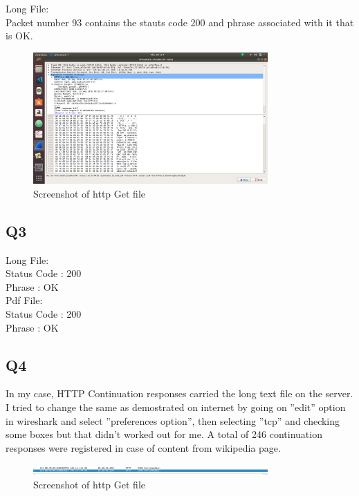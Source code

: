 \documentclass{article}
\begin{document}
 Long File: \\
Packet number 93 contains the stauts code 200 and phrase associated with it that is OK.\\
  \begin{figure}[H]
 \centering
 \includegraphics[width=0.8\textwidth]{../Set3/q2/b.png}
 \caption{\label{fig:PING}Screenshot of http Get file}
 \end{figure}
\subsection{Q3}
Long File:\\
Status Code : 200\\
Phrase : OK\\

Pdf File:\\
Status Code : 200\\
Phrase : OK\\

\subsection{Q4}
In my case, HTTP Continuation responses carried the long text file on the
server. I tried to change the same as demostrated on internet by going on
”edit” option in wireshark and select ”preferences option”, then selecting ”tcp”
and checking some boxes but that didn’t worked out for me. A total of 246
continuation responses were registered in case of content from wikipedia page.\\

  \begin{figure}[H]
 \centering
 \includegraphics[width=0.8\textwidth]{../Set3/q4/a1.png}
 \caption{\label{fig:PING}Screenshot of http Get file}
 \end{figure}
 
\end{document}
